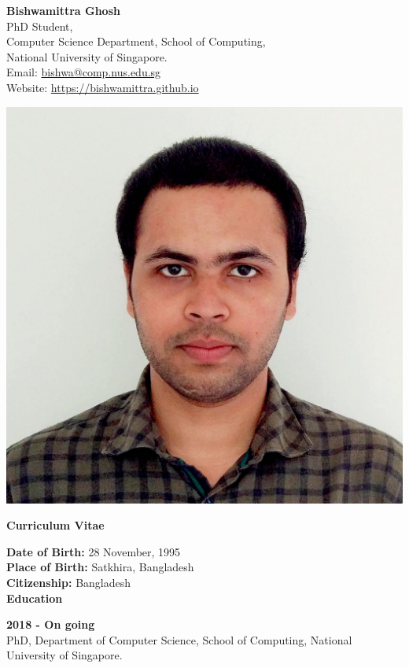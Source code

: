 \documentclass[a4paper,11pt,final]{article}
\newcommand{\CVSection}[1]
{\Large\textbf{#1}\par
	\SmallSep\normalsize\normalfont}
\newcommand{\CVItem}[1]
{\textbf{\color{Black} #1}}
\newcommand{\SmallSep}{\vspace{0.5em}}
\begin{document}
	
	\begin{minipage}{0.8\textwidth}%
	\Large \textbf{Bishwamittra Ghosh}\\
	\normalsize PhD Student,\\
	 Computer Science Department, School of Computing,\\
	 National University of Singapore.\\
	 Email: \url{bishwa@comp.nus.edu.sg}  \\
	 Website: \url{https://bishwamittra.github.io}
	\end{minipage}%
	\hfill%
	\begin{minipage}{0.2\textwidth}
		\includegraphics[width=\linewidth]{photo.jpg}
		
	\end{minipage}


\vspace{.5 cm}
\Large \centerline{ \textbf{Curriculum Vitae}}
\vspace{.5 cm}
\normalsize
\normalfont
\CVItem{Date of Birth:}  28  November,  1995 \\
\CVItem{Place of Birth:} Satkhira, Bangladesh\\
\CVItem{Citizenship:} Bangladesh\\

\CVSection{Education}
\CVItem{ 2018  - On going}\\
PhD, Department of Computer Science, School of Computing, National University of Singapore.
\SmallSep
\end{document}
